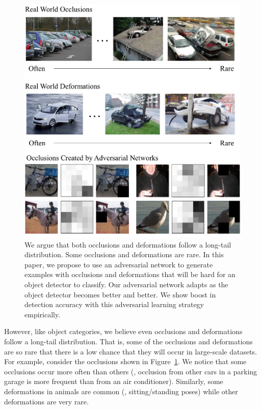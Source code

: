\documentclass[10pt,twocolumn,letterpaper]{article}
\begin{document}
\begin{figure}
    \centering
    \vspace{-0.25in}
    \includegraphics[width=\linewidth]{teaser2.pdf}
    \caption{We argue that both occlusions and deformations follow a long-tail distribution. Some occlusions and deformations are rare. In this paper, we propose to use an adversarial network to generate examples with occlusions and deformations that will be hard for an object detector to classify. Our adversarial network adapts as the object detector becomes better and better. We show boost in detection accuracy with this adversarial learning strategy  empirically.}\label{fig:occlusions}
    \vspace{-0.2in}
\end{figure}


However, like object categories, we believe even occlusions and deformations follow a long-tail distribution. That is, some of the occlusions and deformations are so rare that there is a low chance that they will occur in large-scale datasets. 
For example, consider the occlusions shown in Figure~\ref{fig:occlusions}. We notice that some occlusions occur more often than others (\eg, occlusion from other cars in a parking garage is more frequent than from an air conditioner). Similarly, some deformations in animals are common (\eg, sitting/standing poses) while other deformations are very rare.
\end{document}
